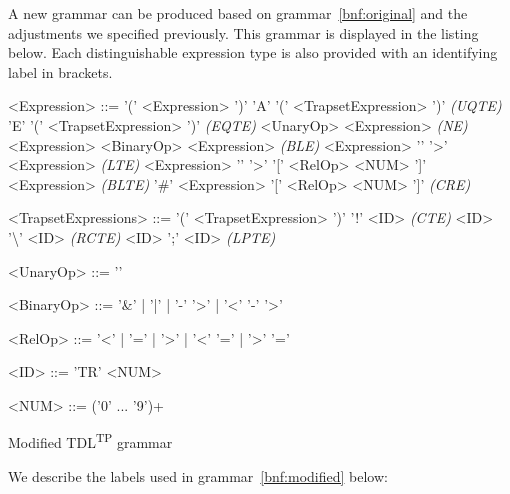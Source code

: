 \documentclass[12pt,oneside,a4paper,notitlepage]{report}
\newcommand{\texttilde}{\raisebox{0.5ex}{\texttildelow}}
\begin{document}
	\bigskip

	\par A new grammar can be produced based on grammar~\ref{bnf:original} and the adjustments we specified previously. This grammar is displayed in the listing below. Each distinguishable expression type is also provided with an identifying label in brackets.
		
	\begin{GrammarWrapper}
		\begin{grammar}
			<Expression>	::=	'(' <Expression> ')'
			\alt 				'A' '(' <TrapsetExpression> ')' \textit{(UQTE)}
			\alt 				'E' '(' <TrapsetExpression> ')' \textit{(EQTE)}
			\alt 				<UnaryOp> <Expression> \textit{(NE)}
			\alt 				<Expression> <BinaryOp> <Expression> \textit{(BLE)}
			\alt 				<Expression> '\texttilde' '\textgreater' <Expression> \textit{(LTE)}
			\alt 				<Expression> '\texttilde' '\textgreater' '[' <RelOp> <NUM> ']' <Expression> \textit{(BLTE)}
			\alt 				'\#' <Expression> '[' <RelOp> <NUM> ']' \textit{(CRE)}
	
			<TrapsetExpressions>	::=	'(' <TrapsetExpression> ')'
			\alt						'!' <ID> \textit{(CTE)}
			\alt 						<ID> '\textbackslash' <ID> \textit{(RCTE)}
			\alt						<ID> ';' <ID> \textit{(LPTE)}
	
			<UnaryOp>	::= '\texttilde'
	
			<BinaryOp>	::= '\&' | '|' | '-' '\textgreater' | '\textless' '-' '\textgreater'
	
			<RelOp> 	::= '\textless' | '=' | '\textgreater' | '\textless' '=' | '\textgreater' '='
	
			<ID> 		::= 'TR' <NUM>
	
			<NUM> 		::= ('0' ... '9')+
		\end{grammar}
		\caption{Modified TDL\textsuperscript{TP} grammar}\label{bnf:modified}
	\end{GrammarWrapper}

	\newpage

	\par We describe the labels used in grammar~\ref{bnf:modified} below: %
\end{document}
